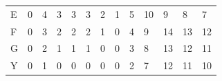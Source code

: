 \documentclass{bredelebeamer}
\begin{document}
\begin{frame}
\begin{table}[]
\begin{tabular}{lllllllllllll}
\multicolumn{1}{l|}{E}  & \multicolumn{1}{l|}{0} & \multicolumn{1}{l|}{4} & \multicolumn{1}{l|}{3} & \multicolumn{1}{l|}{3} & \multicolumn{1}{l|}{3} & \multicolumn{1}{l|}{2} & \multicolumn{1}{l|}{1} & \multicolumn{1}{l|}{5} & \multicolumn{1}{l|}{10} & \multicolumn{1}{l|}{9}  & \multicolumn{1}{l|}{8}  & \multicolumn{1}{l|}{7}  \\ \cline{2-13} 
\multicolumn{1}{l|}{F}  & \multicolumn{1}{l|}{0} & \multicolumn{1}{l|}{3} & \multicolumn{1}{l|}{2} & \multicolumn{1}{l|}{2} & \multicolumn{1}{l|}{2} & \multicolumn{1}{l|}{1} & \multicolumn{1}{l|}{0} & \multicolumn{1}{l|}{4} & \multicolumn{1}{l|}{9}  & \multicolumn{1}{l|}{14} & \multicolumn{1}{l|}{13} & \multicolumn{1}{l|}{12} \\ \cline{2-13} 
\multicolumn{1}{l|}{G}  & \multicolumn{1}{l|}{0} & \multicolumn{1}{l|}{2} & \multicolumn{1}{l|}{1} & \multicolumn{1}{l|}{1} & \multicolumn{1}{l|}{1} & \multicolumn{1}{l|}{0} & \multicolumn{1}{l|}{0} & \multicolumn{1}{l|}{3} & \multicolumn{1}{l|}{8}  & \multicolumn{1}{l|}{13} & \multicolumn{1}{l|}{12} & \multicolumn{1}{l|}{11} \\ \cline{2-13} 
\multicolumn{1}{l|}{Y}  & \multicolumn{1}{l|}{0} & \multicolumn{1}{l|}{1} & \multicolumn{1}{l|}{0} & \multicolumn{1}{l|}{0} & \multicolumn{1}{l|}{0} & \multicolumn{1}{l|}{0} & \multicolumn{1}{l|}{0} & \multicolumn{1}{l|}{2} & \multicolumn{1}{l|}{7}  & \multicolumn{1}{l|}{12} & \multicolumn{1}{l|}{11} & \multicolumn{1}{l|}{10} \\ \cline{2-13} 
\end{tabular}
\end{table}
 \end{frame}
 
\end{document}
